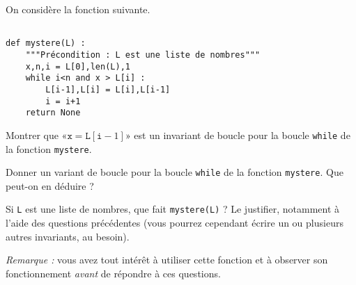 \exer{}
\setcounter{numques}{0}

On considère la fonction suivante.
\begin{lstlisting}

def mystere(L) :
    """Précondition : L est une liste de nombres"""
    x,n,i = L[0],len(L),1
    while i<n and x > L[i] :
        L[i-1],L[i] = L[i],L[i-1]
        i = i+1
    return None
\end{lstlisting}


\question{}Montrer que «$\texttt x = \texttt L[\texttt i-1]$» est un invariant de boucle pour la boucle \texttt{while} de la fonction \texttt{mystere}.

\question{}Donner un variant de boucle pour la boucle \texttt{while} de la fonction \texttt{mystere}. Que peut-on en déduire ? 

\question{}Si \texttt{L} est une liste de nombres, que fait \texttt{mystere(L)} ? Le justifier, notamment à l'aide des questions précédentes (vous pourrez cependant écrire un ou plusieurs autres invariants, au besoin).

\bigskip{}

\emph{Remarque :} vous avez tout intérêt à utiliser cette fonction et à observer son fonctionnement \emph{avant} de répondre à ces questions. 



